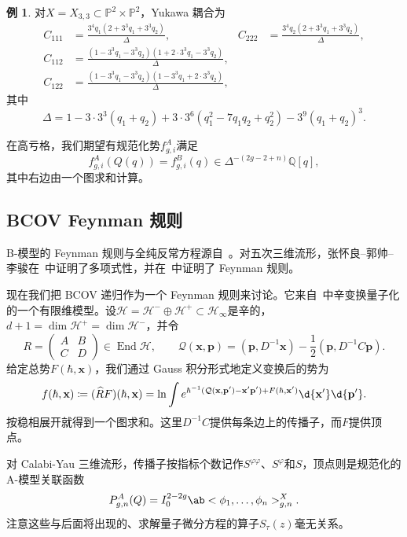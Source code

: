 \documentclass{amsart}
\theoremstyle{definition}
\newtheorem{exm}[thm]{例}
\theoremstyle{remark}
\theoremstyle{plain}
\theoremstyle{definition}
\theoremstyle{remark}
\newcommand{\Q}{\mathbb{Q}}
\renewcommand{\P}{\mathbb{P}}
\newcommand{\mc}[1]{\mathcal{#1}}
\newcommand{\mbf}[1]{\mathbf{#1}}
\newcommand{\bp}{\mbf{p}}
\newcommand{\wh}[1]{\widehat{#1}}
\newcommand{\1}{\mathbf{1}}
\newcommand{\2}{\mathbf{2}}
\newcommand{\3}{\mathbf{3}}
\DeclareMathOperator{\End}{End}
\begin{document}
\begin{exm}
    对\(X = X_{3,3} \subset \P^2 \times \P^2\)，Yukawa 耦合为
    \begin{align*}
        C_{111} &= \frac{3^4 q_1 (2+3^3q_1+3^3q_2)}{\Delta}, & C_{222} &= \frac{3^4 q_2(2+3^3q_1+3^3q_2)}{\Delta}, \\
        C_{112} &= \frac{(1-3^3q_1-3^3q_2)(1+2\cdot 3^3 q_1 - 3^3 q_2)}{\Delta}, \\
        C_{122} &= \frac{(1-3^3q_1-3^3q_2)(1-3^3q_1+2\cdot3^3q_2)}{\Delta},
    \end{align*}
    其中
    \[ \Delta = 1 - 3\cdot3^3(q_1+q_2) + 3\cdot3^6(q_1^2 - 7q_1q_2+q_2^2) - 3^9(q_1+q_2)^3. \]
\end{exm}

在高亏格，我们期望有规范化势\(f^A_{g,i}\)满足
\[ f^A_{g,i}(Q(q)) = f^B_{g,i}(q) \in \Delta^{-(2g-2+n)}\Q[q], \]
其中右边由一个图求和计算。

\subsection{BCOV Feynman 规则}%
\label{sub:The BCOV Feynman rule}

B-模型的 Feynman 规则与全纯反常方程源自~\cite{BCOV1994}。对五次三维流形，张怀良–郭帅–李骏在~\cite{CGL2021}中证明了多项式性，并在~\cite{CGL2026}中证明了 Feynman 规则。

现在我们把 BCOV 递归作为一个 Feynman 规则来讨论。它来自~中辛变换量子化的一个有限维模型。设\(\mc{H} = \mc{H}^- \oplus \mc{H}^+ \subset \mc{H}_{\infty}\)是辛的，\(d+1 = \dim \mc{H}^+ = \dim \mc{H}^-\)，并令
\[ R = \begin{pmatrix} A & B \\ C & D \end{pmatrix} \in \End \mc{H}, \qquad \mc{Q}(\mbf{x},\bp) = (\bp, D^{-1}\mbf{x}) - \frac{1}{2}(\bp, D^{-1}C\bp). \]
给定总势\(F(\hbar, \mbf{x})\)，我们通过 Gauss 积分形式地定义变换后的势为
\[ f(\hbar, \mbf{x}) \coloneqq (\wh{R}F)(\hbar,\mbf{x}) = \ln \int e^{\hbar^{-1}(\mc{Q}(\mbf{x},\bp') - \mbf{x}'\bp') + F(\hbar,\mbf{x}')}\d{\mbf{x}'}\d{\bp'}. \]
按稳相展开就得到一个图求和。这里\(D^{-1}C\)提供每条边上的传播子，而\(F\)提供顶点。

对 Calabi-Yau 三维流形，传播子按指标个数记作\(S^{\varphi\varphi}\)、\(S^{\varphi}\)和\(S\)，顶点则是规范化的 A-模型关联函数
\[ P^A_{g,n}(Q) = I_0^{2-2g}\ab<\phi_1, \ldots, \phi_n>^X_{g,n}. \]
注意这些与后面将出现的、求解量子微分方程的算子\(S_{\tau}(z)\)毫无关系。
\end{document}
